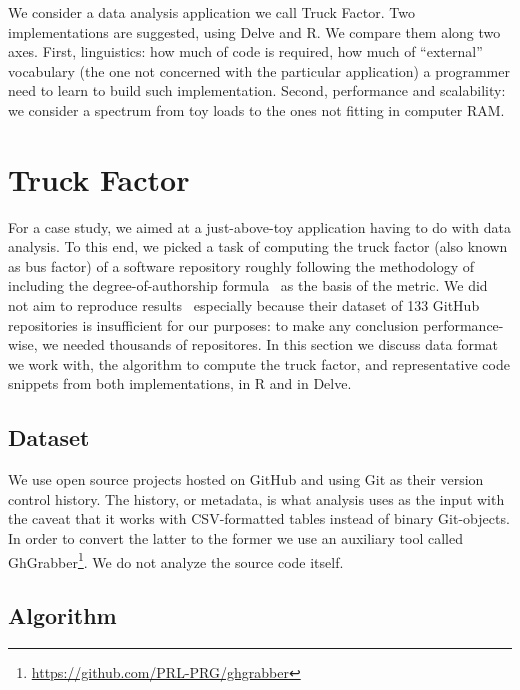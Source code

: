 We consider a data analysis application we call Truck Factor.
Two implementations are suggested, using Delve and R. We compare them
along two axes. First, linguistics: how much of code is required,
how much of ``external'' vocabulary (the one not concerned with the particular
application) a programmer need to learn to build such implementation.
Second, performance and scalability: we consider a spectrum from
toy loads to the ones not fitting in computer RAM.

\section{Truck Factor}

For a case study, we aimed at a just-above-toy application having to
do with data analysis. To this end, we picked a task of computing the
truck factor (also known as bus factor) of a software repository
roughly following the methodology of~\cite{tf} including the
degree-of-authorship formula~\cite{doa} as the basis of the metric.
We did not aim to reproduce results~\cite{tf}
especially because their dataset of 133 GitHub repositories is insufficient
for our purposes: to make any conclusion performance-wise, we needed
thousands of repositores. In this section we discuss data format we work with,
the algorithm to compute the truck factor, and representative code snippets
from both implementations, in R and in Delve.

\subsection{Dataset}

We use open source projects hosted on GitHub and using Git as their
version control history. The history, or metadata, is what analysis
uses as the input with the caveat that it works with CSV-formatted
tables instead of binary Git-objects. In order to convert the latter
to the former we use an auxiliary tool called
GhGrabber\footnote{\url{https://github.com/PRL-PRG/ghgrabber}}.
We do not analyze the source code itself.

\subsection{Algorithm}


